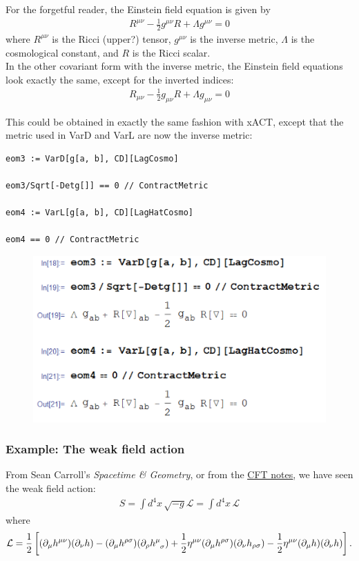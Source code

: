 \documentclass{book}
\theoremstyle{definition}
\newcommand{\p}{\partial}
\newcommand{\lag}{\mathcal{L}}
\newcommand{\f}[2]{\frac{#1}{#2}}
\newcommand{\lb}{\left[}
\newcommand{\rb}{\right]}
\begin{document}
For the forgetful reader, the Einstein field equation is given by
\begin{align}
R^{\mu\nu} - \f{1}{2}g^{\mu\nu}R + \Lambda g^{\mu\nu} = 0
\end{align}
where $R^{\mu\nu}$ is the Ricci (upper?) tensor, $g^{\mu\nu}$ is the inverse metric, $\Lambda$ is the cosmological constant, and $R$ is the Ricci scalar. \\

In the other covariant form with the inverse metric, the Einstein field equations look exactly the same, except for the inverted indices:
\begin{align}
R_{\mu\nu} - \f{1}{2}g_{\mu\nu}R + \Lambda g_{\mu\nu} = 0
\end{align}

This could be obtained in exactly the same fashion with xACT, except that the metric used in VarD and VarL are now the inverse metric:
\begin{lstlisting}
eom3 := VarD[g[a, b], CD][LagCosmo]

eom3/Sqrt[-Detg[]] == 0 // ContractMetric

eom4 := VarL[g[a, b], CD][LagHatCosmo]

eom4 == 0 // ContractMetric
\end{lstlisting}
\begin{figure}[!htb]
	\includegraphics[scale=0.2]{EinsteinFields}
\end{figure}




\subsubsection{Example: The weak field action}


From Sean Carroll's \textit{Spacetime \& Geometry}, or from the \href{https://huanqbui.com/LaTeX projects/Classical_Fields_Theory/HuanBui_ClassicalFieldTheory.pdf}{\underline{CFT notes}}, we have seen the weak field action:
\begin{align}
S = \int d^4x\, \sqrt{-g}\lag = \int d^4x\, \lag
\end{align}
where
\begin{align}
\lag = \f{1}{2}\lb(\p_\mu h^{\mu\nu})(\p_\nu h) - (\p_\mu h^{\rho\sigma})(\p_\rho \tensor{h}{^\mu_\sigma}) + \f{1}{2} \eta^{\mu\nu}(\p_\mu h^{\rho\sigma})(\p_\nu h_{\rho\sigma})   - \f{1}{2} \eta^{\mu\nu}(\p_\mu h)(\p_\nu h) \rb.
\end{align}
\end{document}
